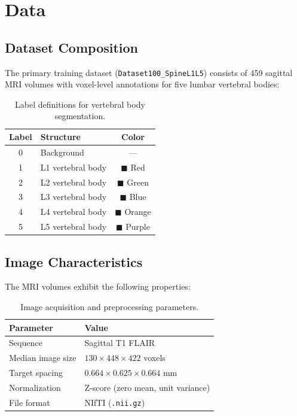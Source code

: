 \documentclass[12pt, a4paper]{article}
\begin{document}
\section{Data}

\subsection{Dataset Composition}

The primary training dataset (\texttt{Dataset100\_SpineL1L5}) consists of 459 sagittal MRI volumes with voxel-level annotations for five lumbar vertebral bodies:

\begin{table}[H]
\centering
\caption{Label definitions for vertebral body segmentation.}
\begin{tabular}{@{}clc@{}}
\toprule
\textbf{Label} & \textbf{Structure} & \textbf{Color} \\
\midrule
0 & Background & --- \\
1 & L1 vertebral body & \textcolor{L1color}{$\blacksquare$} Red \\
2 & L2 vertebral body & \textcolor{L2color}{$\blacksquare$} Green \\
3 & L3 vertebral body & \textcolor{L3color}{$\blacksquare$} Blue \\
4 & L4 vertebral body & \textcolor{L4color}{$\blacksquare$} Orange \\
5 & L5 vertebral body & \textcolor{L5color}{$\blacksquare$} Purple \\
\bottomrule
\end{tabular}
\end{table}

\subsection{Image Characteristics}

The MRI volumes exhibit the following properties:

\begin{table}[H]
\centering
\caption{Image acquisition and preprocessing parameters.}
\begin{tabular}{@{}ll@{}}
\toprule
\textbf{Parameter} & \textbf{Value} \\
\midrule
Sequence & Sagittal T1 FLAIR \\
Median image size & $130 \times 448 \times 422$ voxels \\
Target spacing & $0.664 \times 0.625 \times 0.664$ mm \\
Normalization & Z-score (zero mean, unit variance) \\
File format & NIfTI (\texttt{.nii.gz}) \\
\bottomrule
\end{tabular}
\end{table}
\end{document}
